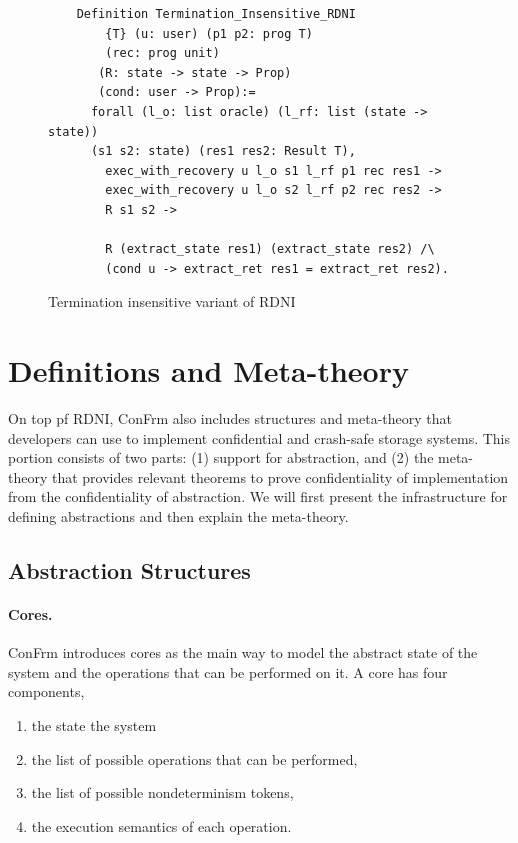 \begin{figure}[H]
    \centering
    \begin{verbatim}
    Definition Termination_Insensitive_RDNI
        {T} (u: user) (p1 p2: prog T) 
        (rec: prog unit)
       (R: state -> state -> Prop) 
       (cond: user -> Prop):=
      forall (l_o: list oracle) (l_rf: list (state -> state))
      (s1 s2: state) (res1 res2: Result T),
        exec_with_recovery u l_o s1 l_rf p1 rec res1 ->
        exec_with_recovery u l_o s2 l_rf p2 rec res2 ->
        R s1 s2 ->
        
        R (extract_state res1) (extract_state res2) /\
        (cond u -> extract_ret res1 = extract_ret res2).
    \end{verbatim}
    \caption{Termination insensitive variant of RDNI}
    \label{fig:TI_RDNI}
\end{figure}

\section{Definitions and Meta-theory}
On top pf RDNI, ConFrm also includes structures and meta-theory that developers can use to implement confidential and crash-safe storage systems. This portion consists of two parts: (1) support for abstraction, and (2) the meta-theory that provides relevant theorems to prove confidentiality of implementation from the confidentiality of abstraction. We will first present the infrastructure for defining abstractions and then explain the meta-theory.

\subsection{Abstraction Structures}
\paragraph{Cores.}
ConFrm introduces cores as the main way to model the abstract state of the system and the operations that can be performed on it. A core has four components,
\begin{enumerate}
    \item the state the system
    \item the list of possible operations that can be performed,
    \item the list of possible nondeterminism tokens,
    \item the execution semantics of each operation.
\end{enumerate}


